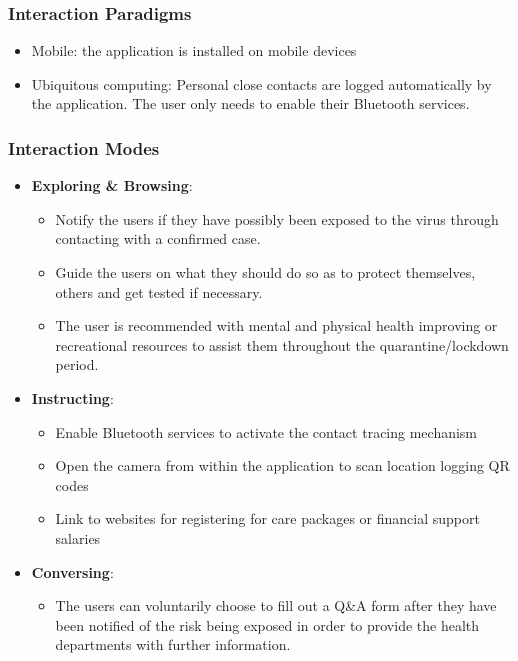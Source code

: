     \subsubsection{Interaction Paradigms}
      \begin{itemize}
        \item Mobile: the application is installed on mobile devices
        \item Ubiquitous computing: Personal close contacts are logged automatically by the application. The user only needs to enable their Bluetooth services.
      \end{itemize}

    \subsubsection{Interaction Modes}
      \begin{itemize}
        \item \textbf{Exploring \& Browsing}:
          \begin{itemize}
            \item Notify the users if they have possibly been exposed to the virus through contacting with a confirmed case.
            \item Guide the users on what they should do so as to protect themselves, others and get tested if necessary.
            \item The user is recommended with mental and physical health improving or recreational resources to assist them throughout the quarantine/lockdown period.
          \end{itemize}
        \item \textbf{Instructing}:
          \begin{itemize}
            \item Enable Bluetooth services to activate the contact tracing mechanism
            \item Open the camera from within the application to scan location logging QR codes
            \item Link to websites for registering for care packages or financial support salaries
          \end{itemize}
        \item \textbf{Conversing}:
          \begin{itemize}
            \item The users can voluntarily choose to fill out a Q&A form after they have been notified of the risk being exposed in order to provide the health departments with further information.
          \end{itemize}
      \end{itemize}
    
